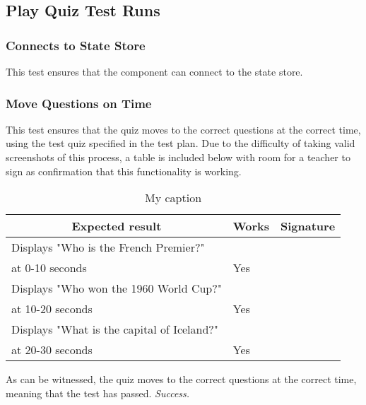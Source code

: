 \subsection{Play Quiz Test Runs} %
\label{sub:play_quiz_test_runs}

\subsubsection{Connects to State Store} %
\label{ssub:connects_to_state_store}
This test ensures that the component can connect to the state store.

\subsubsection{Move Questions on Time}
This test ensures that the quiz moves to the correct questions at the correct time, using the test quiz specified in the test plan. Due to the difficulty of taking valid screenshots of this process, a table is included below with room for a teacher to sign as confirmation that this functionality is working.

\begin{table}[]
\centering
\begin{tabular}{|l|l|l|}
\hline
\multicolumn{1}{|c|}{\textbf{Expected result}}              & \multicolumn{1}{c|}{\textbf{Works}} & \multicolumn{1}{c|}{\textbf{Signature}} \\ \hline
Displays "Who is the French Premier?"\\ at 0-10 seconds       & Yes                                 &                                         \\ \hline
Displays "Who won the 1960 World Cup?"\\ at 10-20 seconds     & Yes                                 &                                         \\ \hline
Displays "What is the capital of Iceland?"\\ at 20-30 seconds & Yes                                 &                                         \\ \hline
\end{tabular}
\caption{My caption}
\label{my-label}
\end{table}

As can be witnessed, the quiz moves to the correct questions at the correct time, meaning that the test has passed. \textit{Success.}
